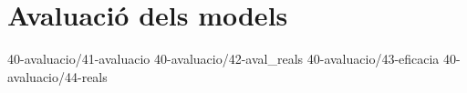 \chapter{Avaluació dels models}

{40-avaluacio/41-avaluacio}
{40-avaluacio/42-aval_reals}
{40-avaluacio/43-eficacia}
{40-avaluacio/44-reals}
